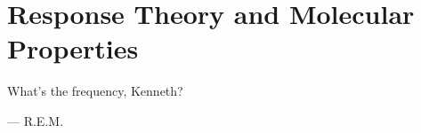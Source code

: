 \chapter{Response Theory and Molecular Properties}\label{ch:molprop}
\epigraph{What's the frequency, Kenneth?}{--- \textsc{R.E.M.}}

